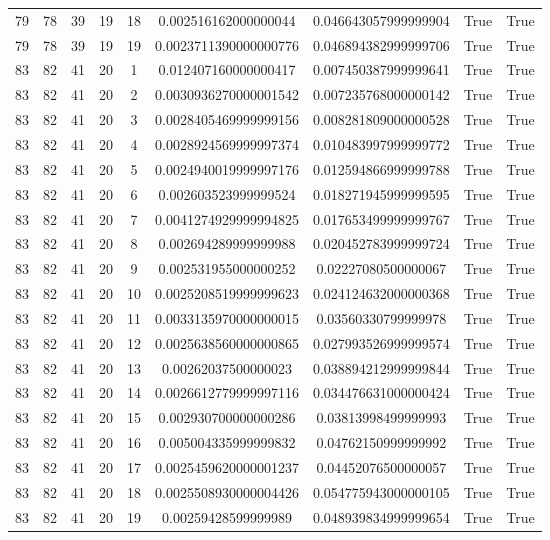 \documentclass[a4paper,11pt]{article}
\begin{document}
\begin{landscape}
\begin{longtable}{ccccccccc}
79 & 78 & 39 & 19 & 18 & 0.002516162000000044 & 0.046643057999999904 & True & True \\
79 & 78 & 39 & 19 & 19 & 0.0023711390000000776 & 0.046894382999999706 & True & True \\
83 & 82 & 41 & 20 & 1 & 0.012407160000000417 & 0.007450387999999641 & True & True \\
83 & 82 & 41 & 20 & 2 & 0.0030936270000001542 & 0.007235768000000142 & True & True \\
83 & 82 & 41 & 20 & 3 & 0.0028405469999999156 & 0.008281809000000528 & True & True \\
83 & 82 & 41 & 20 & 4 & 0.0028924569999997374 & 0.010483997999999772 & True & True \\
83 & 82 & 41 & 20 & 5 & 0.0024940019999997176 & 0.012594866999999788 & True & True \\
83 & 82 & 41 & 20 & 6 & 0.002603523999999524 & 0.018271945999999595 & True & True \\
83 & 82 & 41 & 20 & 7 & 0.0041274929999994825 & 0.017653499999999767 & True & True \\
83 & 82 & 41 & 20 & 8 & 0.002694289999999988 & 0.020452783999999724 & True & True \\
83 & 82 & 41 & 20 & 9 & 0.002531955000000252 & 0.02227080500000067 & True & True \\
83 & 82 & 41 & 20 & 10 & 0.0025208519999999623 & 0.024124632000000368 & True & True \\
83 & 82 & 41 & 20 & 11 & 0.0033135970000000015 & 0.03560330799999978 & True & True \\
83 & 82 & 41 & 20 & 12 & 0.0025638560000000865 & 0.027993526999999574 & True & True \\
83 & 82 & 41 & 20 & 13 & 0.00262037500000023 & 0.038894212999999844 & True & True \\
83 & 82 & 41 & 20 & 14 & 0.0026612779999997116 & 0.034476631000000424 & True & True \\
83 & 82 & 41 & 20 & 15 & 0.002930700000000286 & 0.03813998499999993 & True & True \\
83 & 82 & 41 & 20 & 16 & 0.005004335999999832 & 0.04762150999999992 & True & True \\
83 & 82 & 41 & 20 & 17 & 0.0025459620000001237 & 0.04452076500000057 & True & True \\
83 & 82 & 41 & 20 & 18 & 0.0025508930000004426 & 0.054775943000000105 & True & True \\
83 & 82 & 41 & 20 & 19 & 0.00259428599999989 & 0.048939834999999654 & True & True \\

\end{longtable}
\end{landscape}
\end{document}
